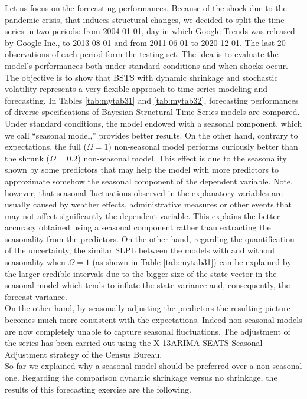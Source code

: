 \documentclass[
  12pt,
]{book}
\theoremstyle{break}
\theoremstyle{nonumberplain}
\begin{document}
Let us focus on the forecasting performances. Because of the shock due
to the pandemic crisis, that induces structural changes, we decided to
split the time series in two periods: from 2004-01-01, day in which
Google Trends was released by Google Inc., to 2013-08-01 and from
2011-06-01 to 2020-12-01. The last 20 observations of each period form
the testing set. The idea is to evaluate the model's performances both
under standard conditions and when shocks occur. The objective is to
show that BSTS with dynamic shrinkage and stochastic volatility
represents a very flexible approach to time series modeling and
forecasting. In Tables \ref{tab:mytab31} and \ref{tab:mytab32},
forecasting performances of diverse specifications of Bayesian
Structural Time Series models are compared. Under standard conditions,
the model endowed with a seasonal component, which we call ``seasonal
model,'' provides better results. On the other hand, contrary to
expectations, the full (\(\Omega=1\)) non-seasonal model performs
curiously better than the shrunk (\(\Omega=0.2\)) non-seasonal model.
This effect is due to the seasonality shown by some predictors that may
help the model with more predictors to approximate somehow the seasonal
component of the dependent variable. Note, however, that seasonal
fluctuations observed in the explanatory variables are usually caused by
weather effects, administrative measures or other events that may not
affect significantly the dependent variable. This explains the better
accuracy obtained using a seasonal component rather than extracting the
seasonality from the predictors. On the other hand, regarding the
quantification of the uncertainty, the similar SLPL between the models
with and without seasonality when \(\Omega=1\) (as shown in Table
\ref{tab:mytab31}) can be explained by the larger credible intervals due
to the bigger size of the state vector in the seasonal model which tends
to inflate the state variance and, consequently, the forecast
variance.\\
On the other hand, by seasonally adjusting the predictors the resulting
picture becomes much more consistent with the expectations. Indeed
non-seasonal models are now completely unable to capture seasonal
fluctuations. The adjustment of the series has been carried out using
the X-13ARIMA-SEATS Seasonal Adjustment strategy of the Census Bureau.\\
So far we explained why a seasonal model should be preferred over a
non-seasonal one. Regarding the comparison dynamic shrinkage versus no
shrinkage, the results of this forecasting exercise are the following.
\end{document}
